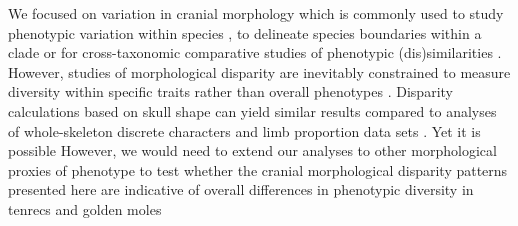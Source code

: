 \documentclass[12pt,a4paper]{article}
\begin{document}
	
	
	




	We focused on variation in cranial morphology which is commonly used to study phenotypic variation within species \citep{Blagojevic2011, Bornholdt2008}, to delineate species boundaries within a clade \citep[e.g.][]{Panchetti2008} or for cross-taxonomic comparative studies of phenotypic (dis)similarities \citep[e.g.][]{Ruta2013, Goswami2011, Wroe2007}.
	However, studies of morphological disparity are inevitably constrained to measure diversity within specific traits rather than overall phenotypes \citep{Roy1997}. Disparity calculations based on skull shape can yield similar results compared to analyses of whole-skeleton discrete characters and limb proportion data sets \citep{Foth2012}. Yet it is possible However, we would need to extend our analyses to other morphological proxies of phenotype to test whether the cranial morphological disparity patterns presented here are indicative of overall differences in phenotypic diversity in tenrecs and golden moles
\end{document}
